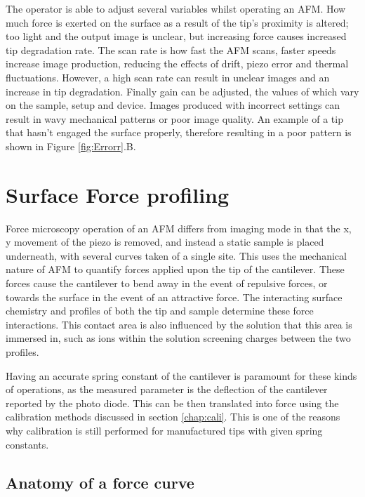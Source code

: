 The operator is able to adjust several variables whilst operating an AFM. How much force is exerted on the surface as a result of the tip's proximity is altered; too light and the output image is unclear, but  increasing force causes increased tip degradation rate. The scan rate is how fast the AFM scans, faster speeds increase image production, reducing the effects of drift, piezo error and thermal fluctuations. However, a high scan rate can result in unclear images and an increase in tip degradation. Finally gain can be adjusted, the values of which vary on the sample, setup and device. Images produced with incorrect settings can result in wavy mechanical patterns or poor image quality. An example of a tip that hasn't engaged the surface properly, therefore resulting in a poor pattern is shown in Figure \ref{fig:Errorr}.B. \cite{AFMBook2, AFMBook1}

\section{Surface Force profiling}

Force microscopy operation of an AFM differs from imaging mode in that the x, y movement of the piezo is removed, and instead a static sample is placed underneath, with several curves taken of a single site. This uses the mechanical nature of AFM to quantify forces applied upon the tip of the cantilever. These forces cause the cantilever to bend away in the event of repulsive forces, or towards the surface in the event of an attractive force. The interacting surface chemistry and profiles of both the tip and sample determine these force interactions. This contact area is also influenced by the solution that this area is immersed in, such as ions within the solution screening charges between the two profiles.

Having an accurate spring constant of the cantilever is paramount for these kinds of operations, as the measured parameter is the deflection of the cantilever reported by the photo diode. This can be then translated into force using the calibration methods discussed in section \ref{chap:cali}. This is one of the reasons why calibration is still performed for manufactured tips with given spring constants.

\subsection{Anatomy of a force curve}

